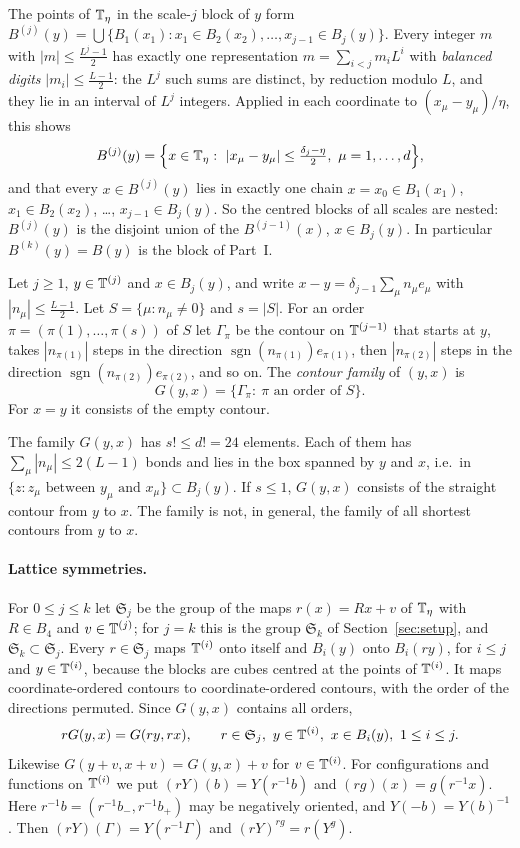 The points of $\mathbb T_\eta$ in the scale-$j$ block of $y$ form $B^{(j)}(y)=\bigcup\{B_1(x_1):x_1\in B_2(x_2),\dots,x_{j-1}\in B_j(y)\}$. Every integer $m$ with $|m|\le\frac{L^j-1}2$ has exactly one representation $m=\sum_{i<j}m_iL^i$ with \emph{balanced digits} $|m_i|\le\frac{L-1}2$: the $L^j$ such sums are distinct, by reduction modulo $L$, and they lie in an interval of $L^j$ integers. Applied in each coordinate to $(x_\mu-y_\mu)/\eta$, this shows
\[
B^{(j)}(y)=\Big\{x\in\Tf:\ |x_\mu-y_\mu|\le\tfrac{\delta_j-\eta}2,\ \mu=1,\dots,d\Big\},
\]
and that every $x\in B^{(j)}(y)$ lies in exactly one chain $x=x_0\in B_1(x_1)$, $x_1\in B_2(x_2)$, \dots, $x_{j-1}\in B_j(y)$. So the centred blocks of all scales are nested: $B^{(j)}(y)$ is the disjoint union of the $B^{(j-1)}(x)$, $x\in B_j(y)$. In particular $B^{(k)}(y)=B(y)$ is the block of Part~I.

\begin{definition}\label{def:families}
Let $j\ge1$, $y\in\mathbb T^{(j)}$ and $x\in B_j(y)$, and write $x-y=\delta_{j-1}\sum_\mu n_\mu e_\mu$ with $|n_\mu|\le\frac{L-1}2$. Let $S=\{\mu:n_\mu\ne0\}$ and $s=|S|$. For an order $\pi=(\pi(1),\dots,\pi(s))$ of $S$ let $\Gamma_\pi$ be the contour on $\mathbb T^{(j-1)}$ that starts at $y$, takes $|n_{\pi(1)}|$ steps in the direction $\operatorname{sgn}(n_{\pi(1)})e_{\pi(1)}$, then $|n_{\pi(2)}|$ steps in the direction $\operatorname{sgn}(n_{\pi(2)})e_{\pi(2)}$, and so on. The \emph{contour family} of $(y,x)$ is
\[
G(y,x)=\{\Gamma_\pi:\ \pi\text{ an order of }S\}.
\]
For $x=y$ it consists of the empty contour.
\end{definition}

The family $G(y,x)$ has $s!\le d!=24$ elements. Each of them has $\sum_\mu|n_\mu|\le2(L-1)$ bonds and lies in the box spanned by $y$ and $x$, i.e.\ in $\{z:z_\mu\text{ between }y_\mu\text{ and }x_\mu\}\subset B_j(y)$. If $s\le1$, $G(y,x)$ consists of the straight contour from $y$ to $x$. The family is not, in general, the family of all shortest contours from $y$ to $x$.

\paragraph{Lattice symmetries.} For $0\le j\le k$ let $\mathfrak S_j$ be the group of the maps $r(x)=Rx+v$ of $\mathbb T_\eta$ with $R\in B_4$ and $v\in\mathbb T^{(j)}$; for $j=k$ this is the group $\mathfrak S_k$ of Section~\ref{sec:setup}, and $\mathfrak S_k\subset\mathfrak S_j$. Every $r\in\mathfrak S_j$ maps $\mathbb T^{(i)}$ onto itself and $B_i(y)$ onto $B_i(ry)$, for $i\le j$ and $y\in\mathbb T^{(i)}$, because the blocks are cubes centred at the points of $\mathbb T^{(i)}$. It maps coordinate-ordered contours to coordinate-ordered contours, with the order of the directions permuted. Since $G(y,x)$ contains all orders,
\[
rG(y,x)=G(ry,rx),\qquad r\in\mathfrak S_j,\ y\in\T^{(i)},\ x\in B_i(y),\ 1\le i\le j.
\]
Likewise $G(y+v,x+v)=G(y,x)+v$ for $v\in\mathbb T^{(i)}$.
For configurations and functions on $\mathbb T^{(i)}$ we put $(rY)(b)=Y(r^{-1}b)$ and $(rg)(x)=g(r^{-1}x)$. Here $r^{-1}b=(r^{-1}b_-,r^{-1}b_+)$ may be negatively oriented, and $Y(-b)=Y(b)^{-1}$. Then $(rY)(\Gamma)=Y(r^{-1}\Gamma)$ and $(rY)^{rg}=r(Y^g)$.

